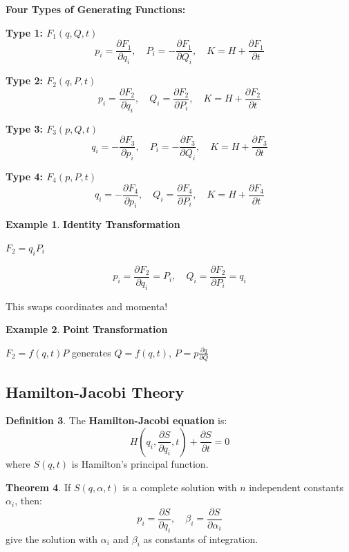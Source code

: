 \documentclass[12pt,a4paper]{article}
\theoremstyle{definition}
\newtheorem{theorem}{Theorem}[section]
\newtheorem{definition}[theorem]{Definition}
\newtheorem{example}[theorem]{Example}
\begin{document}
\begin{importantbox}
\textbf{Four Types of Generating Functions:}

\textbf{Type 1: $F_1(q, Q, t)$}
\[
p_i = \frac{\partial F_1}{\partial q_i}, \quad P_i = -\frac{\partial F_1}{\partial Q_i}, \quad K = H + \frac{\partial F_1}{\partial t}
\]

\textbf{Type 2: $F_2(q, P, t)$}
\[
p_i = \frac{\partial F_2}{\partial q_i}, \quad Q_i = \frac{\partial F_2}{\partial P_i}, \quad K = H + \frac{\partial F_2}{\partial t}
\]

\textbf{Type 3: $F_3(p, Q, t)$}
\[
q_i = -\frac{\partial F_3}{\partial p_i}, \quad P_i = -\frac{\partial F_3}{\partial Q_i}, \quad K = H + \frac{\partial F_3}{\partial t}
\]

\textbf{Type 4: $F_4(p, P, t)$}
\[
q_i = -\frac{\partial F_4}{\partial p_i}, \quad Q_i = \frac{\partial F_4}{\partial P_i}, \quad K = H + \frac{\partial F_4}{\partial t}
\]
\end{importantbox}

\begin{example}
\textbf{Identity Transformation}

$F_2 = q_i P_i$

\[
p_i = \frac{\partial F_2}{\partial q_i} = P_i, \quad Q_i = \frac{\partial F_2}{\partial P_i} = q_i
\]

This swaps coordinates and momenta!
\end{example}

\begin{example}
\textbf{Point Transformation}

$F_2 = f(q, t) P$ generates $Q = f(q, t)$, $P = p \frac{\partial q}{\partial Q}$
\end{example}

\subsection{Hamilton-Jacobi Theory}

\begin{definition}
The \textbf{Hamilton-Jacobi equation} is:
\[
H\left(q_i, \frac{\partial S}{\partial q_i}, t\right) + \frac{\partial S}{\partial t} = 0
\]
where $S(q, t)$ is Hamilton's principal function.
\end{definition}

\begin{theorem}
If $S(q, \alpha, t)$ is a complete solution with $n$ independent constants $\alpha_i$, then:
\[
p_i = \frac{\partial S}{\partial q_i}, \quad \beta_i = \frac{\partial S}{\partial \alpha_i}
\]
give the solution with $\alpha_i$ and $\beta_i$ as constants of integration.
\end{theorem}
\end{document}
